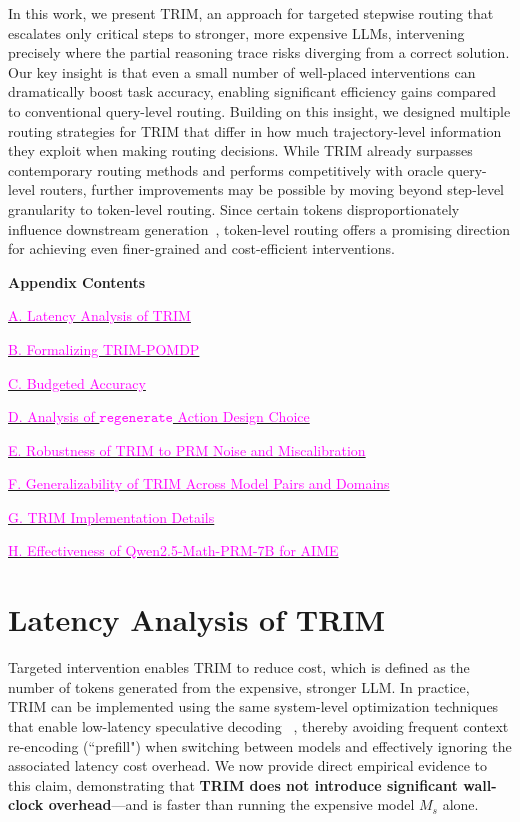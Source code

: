\documentclass{article}
\theoremstyle{plain}
\theoremstyle{definition}
\theoremstyle{remark}
\newcommand{\regen}{\mathtt{regenerate}}
\newcommand{\appendixcontents}{%

  \begin{center}
        {\Large\bfseries Appendix Contents}
    \end{center}
    \noindent
    \hyperref[appendix:latency]{\textcolor{magenta}{A. Latency Analysis of TRIM}} \dotfill \pageref{appendix:latency}
    
    \hyperref[appendix: trim]{\textcolor{magenta}{B. Formalizing TRIM-POMDP}} \dotfill \pageref{appendix: trim} 
    
    \hyperref[sec:budgeted_acc]{\textcolor{magenta}{C. Budgeted Accuracy}} \dotfill \pageref{sec:budgeted_acc}
    
    \hyperref[appendix:action_design]{\textcolor{magenta}{D. Analysis of $\regen$ Action Design Choice}} \dotfill \pageref{appendix:action_design}

    \hyperref[sec:robust]{\textcolor{magenta}{E. Robustness of TRIM to PRM Noise and Miscalibration}} \dotfill \pageref{sec:robust}

    \hyperref[sec:generalizability]{\textcolor{magenta}{F. Generalizability of TRIM Across Model Pairs and Domains}} \dotfill \pageref{sec:generalizability}

    \hyperref[appendix: setup]{\textcolor{magenta}{G. TRIM Implementation Details}} \dotfill \pageref{appendix: setup}

    \hyperref[sec:prm_aime]{\textcolor{magenta}{H. Effectiveness of Qwen2.5-Math-PRM-7B for AIME}} \dotfill \pageref{sec:prm_aime}
}
\begin{document}
In this work, we present TRIM, an approach for targeted stepwise routing that escalates only critical steps to stronger, more expensive LLMs, intervening precisely where the partial reasoning trace risks diverging from a correct solution. Our key insight is that even a small number of well-placed interventions can dramatically boost task accuracy, enabling significant efficiency gains compared to conventional query-level routing. Building on this insight, we designed multiple routing strategies for TRIM that differ in how much trajectory-level information they exploit when making routing decisions. While TRIM already surpasses contemporary routing methods and performs competitively with oracle query-level routers, further improvements may be possible by moving beyond step-level granularity to token-level routing. Since certain tokens disproportionately influence downstream generation~\citep{qwen80/20}, token-level routing offers a promising direction for achieving even finer-grained and cost-efficient interventions.









\clearpage
\appendix
\onecolumn %

\appendixcontents

\section{Latency Analysis of TRIM}
\label{appendix:latency}
Targeted intervention enables TRIM to reduce cost, which is defined as the number of tokens generated from the expensive, stronger LLM. In practice, TRIM can be implemented using the same system-level optimization techniques that enable low-latency speculative decoding ~\citep{speculative, RSD, medusa, specreason}, thereby avoiding frequent context re-encoding (``prefill") when switching between models and effectively ignoring the associated latency cost overhead. We now provide direct empirical evidence to this claim, demonstrating that \textbf{TRIM does not introduce significant wall-clock overhead}—and is faster than running the expensive model $M_s$ alone.
\end{document}
